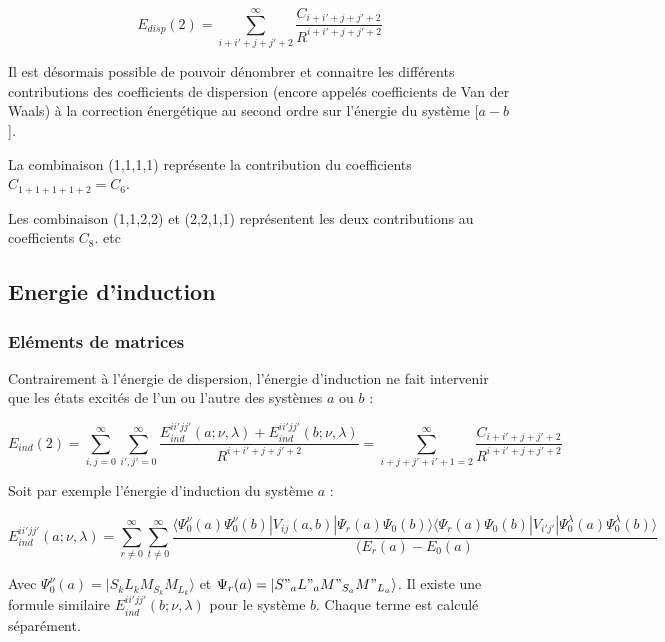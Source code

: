 \begin{equation}
E_{disp}(2) = \sum_{i+i'+j+j'+2}^{\infty} \frac{C_{i+i'+j+j'+2}}{R^{i+i'+j+j'+2}}
\end{equation}

Il est désormais possible de pouvoir dénombrer et connaitre les différents contributions des coefficients de dispersion (encore appelés coefficients de Van der Waals) à la correction énergétique au second ordre sur l'énergie du système [$a - b$].

La combinaison (1,1,1,1) représente la contribution du coefficients $C_{1+1+1+1+2} = C_{6}$.

Les combinaison (1,1,2,2) et (2,2,1,1) représentent les deux contributions au coefficients $C_{8}$. etc



\subsection{Energie d'induction}

\subsubsection{Eléments de matrices}	

Contrairement à l'énergie de dispersion, l'énergie d'induction ne fait intervenir que les états excités de l'un ou l'autre des systèmes $a$ ou $b$ : 

\begin{equation}
E_{ind}(2) = \sum_{i,j=0}^{\infty} \sum_{i',j'=0}^{\infty} \frac{E_{ind}^{ii'jj'} (a; \nu , \lambda) + E_{ind}^{ii'jj'} (b; \nu , \lambda)}{R^{i+i'+j+j'+2}} = \sum_{i+j+j'+i'+1=2}^{\infty} \frac{C_{i+i'+j+j'+2}}{R^{i+i'+j+j'+2}}
\end{equation}


Soit par exemple l'énergie d'induction du système $a$ :

\begin{equation}
E_{ind}^{ii'jj'} (a;\nu , \lambda) = \sum_{r \neq 0}^{\infty} \sum_{t\neq 0}^{\infty} \frac{\langle \Psi_{0}^{\nu} (a) \Psi_{0}^{\nu} (b) |V_{ij} (a,b)|\Psi_{r} (a) \Psi_{0} (b) \rangle  \langle \Psi_{r} (a)\Psi_{0} (b) |V_{i'j'}|\Psi_{0}^{\lambda} (a) \Psi_{0}^{\lambda}(b) \rangle}{(E_{r} (a) - E_{0}(a)}
\end{equation}

Avec $\Psi_{0}^{\nu} (a) = |S_{k} L_{k} M_{S_{k}} M_{L_{k}}\rangle$ et $\Psi_{r}(a) = |S"_{a} L"_{a} M"_{S_{a}} M"_{L_{a}}\rangle$. Il existe une formule similaire $E_{ind}^{ii'jj'} (b;\nu , \lambda)$ pour le système $b$. Chaque terme est calculé séparément.

